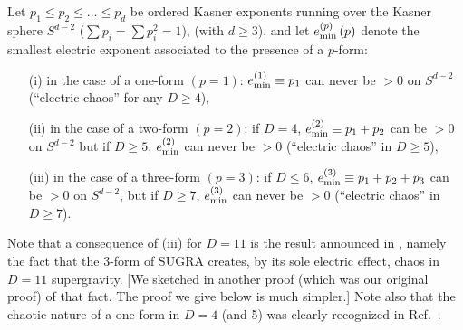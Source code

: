 \documentclass[a4paper,12pt]{article}
\begin{document}
\medskip

 Let $p_1 \leq p_2 \leq \ldots \leq p_d$ be 
ordered Kasner exponents running over the Kasner sphere $S^{d-2}$
($\sum p_i = \sum p_i^2 = 1$), 
(with $d \geq 3$), and let $e_{{\rm min}}^{(p)} \, 
(p)$ denote the smallest electric exponent 
associated to the presence of a $p$-form:
\begin{itemize}
\item[(i)] in the case of a one-form $(p=1)$: $e_{{\rm min}}^{(1)} 
\equiv p_1$ can never be $>0$ on $S^{d-2}$ (``electric chaos'' for any 
$D \geq 4$),
\item[(ii)] in the case of a two-form $(p=2)$: if $D=4$, $e_{{\rm 
min}}^{(2)} \equiv p_1 + p_2$ can be $>0$ on $S^{d-2}$ but if $D \geq 
5$, $e_{{\rm min}}^{(2)}$ can never be $>0$ (``electric chaos'' in $D 
\geq 5$),
\item[(iii)] in the case of a three-form $(p=3)$: if $D \leq 6$, 
$e_{{\rm min}}^{(3)} \equiv p_1 + p_2 + p_3$ can be $>0$ on $S^{d-2}$, 
but if $D \geq 7$, $e_{{\rm min}}^{(3)}$ can never be $>0$ (``electric 
chaos'' in $D \geq 7$).
\end{itemize}

\medskip

Note that a consequence of (iii) for $D=11$ is the result announced in \cite{dh1}, 
namely the fact that the 3-form of SUGRA creates, by its sole electric 
effect, chaos in $D=11$ supergravity. [We sketched in \cite{dh1} 
another proof (which was our original proof) of that fact. The proof we 
give below is much simpler.] Note also that the chaotic nature of a 
one-form in $D=4$ (and 5) was clearly recognized in Ref.~\cite{BK81}.
\end{document}
